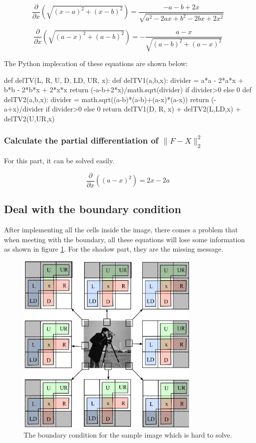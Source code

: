 \documentclass{article}
\begin{document}
$$
\frac{\partial}{\partial x}(\sqrt{(x-a)^{2}+(x-b)^{2}})= 
\frac{-a-b+2 x}{\sqrt{a^{2}-2 a x+b^{2}-2 b x+2 x^{2}}}
$$

$$
\frac{\partial}{\partial x}(\sqrt{(a-x)^{2}+(a-b)^{2}})=-\frac{a-x}{\sqrt{(a-b)^{2}+(a-x)^{2}}}
$$

The Python implecation of these equations are shown below:

\begin{python}
def delTV(L, R, U, D, LD, UR, x):
    def delTV1(a,b,x):
        divider = a*a - 2*a*x + b*b - 2*b*x + 2*x*x
        return (-a-b+2*x)/math.sqrt(divider) if divider>0 else 0
    def delTV2(a,b,x):
        divider = math.sqrt((a-b)*(a-b)+(a-x)*(a-x))
        return (-a+x)/divider if divider>0 else 0
    return delTV1(D, R, x) + delTV2(L,LD,x) + delTV2(U,UR,x)
\end{python}


\subsubsection{Calculate the partial differentiation of $\|F-X\|_{2}^{2}$}

For this part, it can be solved easily.

$$
\frac{\partial}{\partial x}\left((a-x)^{2}\right)=2 x-2 a
$$


\subsection{Deal with the boundary condition}

After implementing all the cells inside the image, there comes a problem that when meeting with the boundary, all these equations will lose some information as shown in figure \ref{img6}. For the shadow part, they are the missing message.

\begin{figure}[h]
  \includegraphics[width=3.5in]{pic6.png}
  \centering
  \caption{The boundary condition for the sample image which is hard to solve.}
  \label{img6}
\end{figure}
\end{document}
